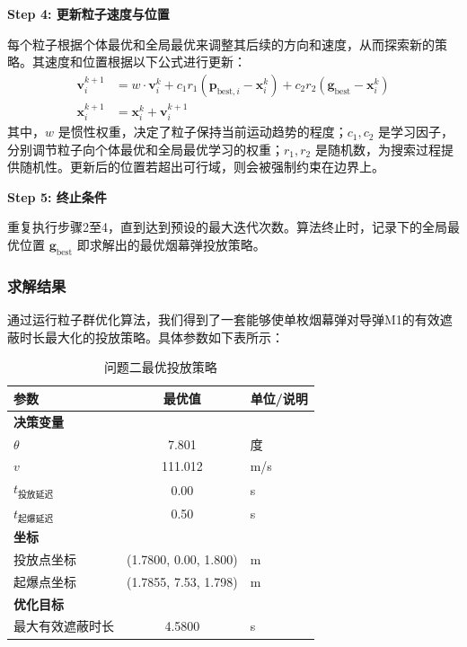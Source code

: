 \documentclass[5pt, withoutpreface,bwprint]{cumcmthesis} %
\begin{document}
        \textbf{Step 4: 更新粒子速度与位置 }
        
        每个粒子根据个体最优和全局最优来调整其后续的方向和速度，从而探索新的策略。其速度和位置根据以下公式进行更新：
        \begin{align}
            \mathbf{v}_{i}^{k+1} &= w \cdot \mathbf{v}_{i}^{k} + c_1 r_1 (\mathbf{p}_{\text{best},i} - \mathbf{x}_{i}^{k}) + c_2 r_2 (\mathbf{g}_{\text{best}} - \mathbf{x}_{i}^{k}) \\
            \mathbf{x}_{i}^{k+1} &= \mathbf{x}_{i}^{k} + \mathbf{v}_{i}^{k+1}
        \end{align}
        其中，$w$ 是惯性权重，决定了粒子保持当前运动趋势的程度；$c_1, c_2$ 是学习因子，分别调节粒子向个体最优和全局最优学习的权重；$r_1, r_2$ 是随机数，为搜索过程提供随机性。更新后的位置若超出可行域，则会被强制约束在边界上。
    
       \textbf{Step 5: 终止条件}
        
        重复执行步骤2至4，直到达到预设的最大迭代次数。算法终止时，记录下的全局最优位置 $\mathbf{g}_{\text{best}}$ 即求解出的最优烟幕弹投放策略。
  \subsubsection{求解结果}
  通过运行粒子群优化算法，我们得到了一套能够使单枚烟幕弹对导弹M1的有效遮蔽时长最大化的投放策略。具体参数如下表所示：
  
  
  \begin{table}[H]
      \centering
      \caption{问题二最优投放策略}
      \label{tab:problem2_results}
      \begin{tabular}{lcl}
          \toprule
          \textbf{参数} & \textbf{最优值} & \textbf{单位/说明} \\
          \midrule
          \multicolumn{3}{l}{\textbf{决策变量}} \\
          $\theta$ & 7.801 & 度\\
          $v$ & 111.012 & m/s  \\
          $t_{\text{投放延迟}}$ & 0.00 & s  \\
          $t_{\text{起爆延迟}}$ & 0.50 & s  \\
          \midrule %
          \multicolumn{3}{l}{\textbf{坐标}} \\
          投放点坐标 & (1.7800, 0.00, 1.800) & m \\
          起爆点坐标 & (1.7855, 7.53, 1.798) & m \\
          \midrule %
          \multicolumn{3}{l}{\textbf{优化目标}} \\
          最大有效遮蔽时长 & 4.5800 & s \\
          \bottomrule
      \end{tabular}
  \end{table}
  
\end{document}
